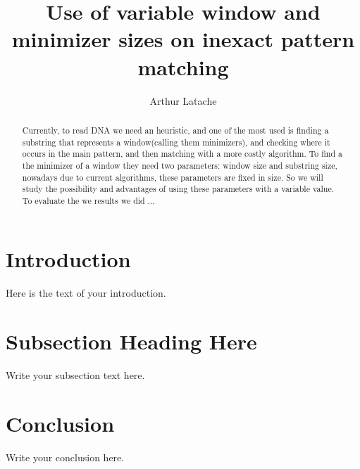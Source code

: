 \documentclass{article}
\begin{document}
\title{Use of variable window and minimizer sizes on inexact pattern matching}
\author{Arthur Latache}

\maketitle

\begin{abstract}
Currently, to read DNA we need an heuristic, and one of the most used is finding a substring that represents a window(calling them minimizers), and checking where it occurs in the main pattern, and then matching with a more costly algorithm. To find a the minimizer of a window they need two parameters: window size and substring size, nowadays due to current algorithms, these parameters are fixed in size. So we will study the possibility and advantages of using these parameters with a variable value. To evaluate the we results we did ...
\end{abstract}
\section{Introduction}
Here is the text of your introduction.

\section{Subsection Heading Here}
Write your subsection text here.

\section{Conclusion}
Write your conclusion here.
\end{document}
